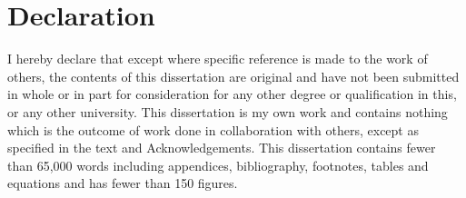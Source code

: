 
\newenvironment{declaration}{
\cleardoublepage
\setsinglecolumn
\chapter* {\centering \Large Declaration}
\thispagestyle{empty}
}{
\flushright
\@author{}\\
\@degreedate{}
\vfill
}


\begin{declaration}

I hereby declare that except where specific reference is made to the work of 
others, the contents of this dissertation are original and have not been 
submitted in whole or in part for consideration for any other degree or 
qualification in this, or any other university. This dissertation is my own 
work and contains nothing which is the outcome of work done in collaboration 
with others, except as specified in the text and Acknowledgements. This 
dissertation contains fewer than 65,000 words including appendices, 
bibliography, footnotes, tables and equations and has fewer than 150 figures.


\end{declaration}